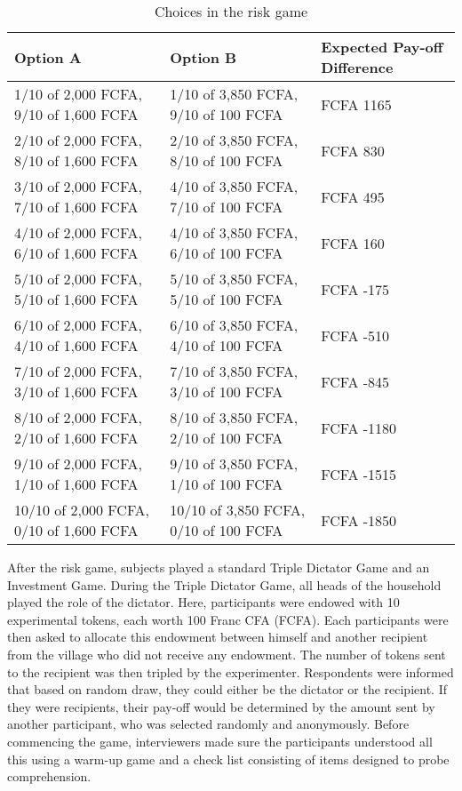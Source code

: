 \begin{table}[htb]
	\centering
	\caption{Choices in the risk game}
	\footnotesize
	\label{tab:risk_choices}
	\begin{tabular}{l l l}

	\toprule
	Option A & Option B & Expected Pay-off Difference \\
	\hline
	1/10 of 2,000 FCFA, 9/10 of 1,600 FCFA	& 1/10 of 3,850 FCFA, 9/10 of 100 FCFA 	& FCFA 1165 \\
	2/10 of 2,000 FCFA, 8/10 of 1,600 FCFA	& 2/10 of 3,850 FCFA, 8/10 of 100 FCFA 	& FCFA 830 \\
	3/10 of 2,000 FCFA, 7/10 of 1,600 FCFA	& 4/10 of 3,850 FCFA, 7/10 of 100 FCFA 	& FCFA 495 \\
	4/10 of 2,000 FCFA, 6/10 of 1,600 FCFA	& 4/10 of 3,850 FCFA, 6/10 of 100 FCFA 	& FCFA 160 \\
	5/10 of 2,000 FCFA, 5/10 of 1,600 FCFA	& 5/10 of 3,850 FCFA, 5/10 of 100 FCFA 	& FCFA -175 \\
	6/10 of 2,000 FCFA, 4/10 of 1,600 FCFA	& 6/10 of 3,850 FCFA, 4/10 of 100 FCFA 	& FCFA -510 \\
	7/10 of 2,000 FCFA, 3/10 of 1,600 FCFA	& 7/10 of 3,850 FCFA, 3/10 of 100 FCFA 	& FCFA -845 \\
	8/10 of 2,000 FCFA, 2/10 of 1,600 FCFA	& 8/10 of 3,850 FCFA, 2/10 of 100 FCFA 	& FCFA -1180 \\
	9/10 of 2,000 FCFA, 1/10 of 1,600 FCFA	& 9/10 of 3,850 FCFA, 1/10 of 100 FCFA 	& FCFA -1515 \\
	10/10 of 2,000 FCFA, 0/10 of 1,600 FCFA	& 10/10 of 3,850 FCFA, 0/10 of 100 FCFA & FCFA -1850 \\
	\bottomrule
	\end{tabular}
\end{table}


After the risk game, subjects played a standard Triple Dictator Game and an Investment Game.  During the Triple Dictator Game, all heads of the household played the role of the dictator. Here, participants were endowed with 10 experimental tokens, each worth 100 Franc CFA (FCFA). Each participants were then asked to allocate this endowment between himself and another recipient from the village who did not receive any endowment. The number of tokens sent to the recipient was then tripled by the experimenter. Respondents were informed that based on random draw, they could either be the dictator or the recipient. If they were recipients, their pay-off would be determined by the amount sent by another participant, who was selected randomly and anonymously. Before commencing the game, interviewers made sure the participants understood all this using a warm-up game and a check list consisting of items designed to probe comprehension.

